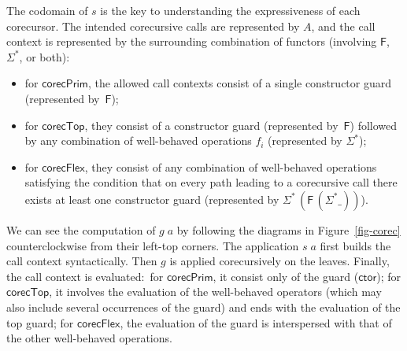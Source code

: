 \documentclass[preprint,draft]
{sigplanconf}
\newcommand\TC{\mathsf}
\newcommand{\<}{\langle}
\renewcommand{\>}{\rangle}
\newcommand{\ctor}{{{\mathsf{ctor}}}}
\newcommand{\corec}{{{\mathsf{corecPrim}}}}
\newcommand\corecU{\mathsf{corecTop}}
\newcommand\corecUU{\mathsf{corecFlex}}
\newcommand{\F}{{\TC{F}}}
\renewcommand{\SS}{{\TC{\Sigma}}}
\begin{document}
The codomain of $s$ is the key to understanding the expressiveness of each corecursor.
The intended corecursive calls are represented by $A$,
and the call context is represented by the surrounding
combination of functors (involving $\F$, $\SS^*$, or both):
\begin{itemize}
\item for $\corec$, the allowed call contexts consist of a single constructor guard (represented by~$\F$);
\item for $\corecU$, they consist of a constructor guard (represented by~$\F$) followed by any combination of well-behaved
operations $f_i$ (represented by $\SS^*$);
\item for $\corecUU$, they consist of any combination of well-behaved operations
satisfying the condition that on every path leading to a corecursive call there exists at least one constructor guard
(represented by $\SS^*\,(\F\,(\SS^*\_))$).
\end{itemize}
We can see the computation of $g\;a$
by following the diagrams in Figure~\ref{fig-corec} counterclockwise from their left-top corners.
The application $s\;a$ first builds the call context {syntactically}.
Then $g$ is applied corecursively on the leaves.
Finally, the call context is evaluated:\ for $\corec$, it consist only of the guard ($\ctor$);
for $\corecU$, it involves the evaluation of the well-behaved operators (which may also include several occurrences of the guard)
and ends with
the evaluation of the top guard;
for $\corecUU$, the evaluation of the guard is
interspersed with that of the other well-behaved operations.
\end{document}
